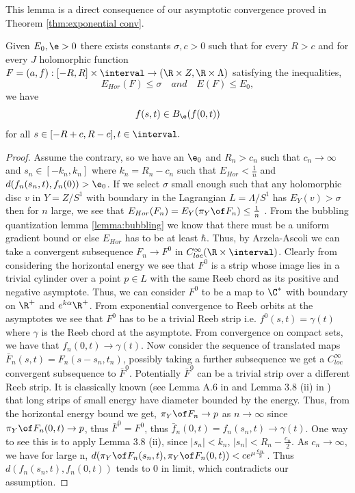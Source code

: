 \noindent This lemma is a direct consequence of our asymptotic convergence proved in Theorem \ref{thm:exponential conv}.

\begin{lemma}\label{lemma:energytodistance}
Given $E_0,\e>0$ there exists constants $\sigma,c>0$ such that for every $R>c$ and for every $J$ holomorphic function $F=(a,f) : [-R,R] \times \interval \to (\R \times Z, \R \times \Lambda)$ satisfying the inequalities, 
$$E_{Hor} (F) \leq \sigma \quad and \quad E(F)\leq E_0,$$ 
we have 
$$f(s,t) \in B_\e(f(0,t))$$ for all $s\in [-R+c,R-c] , t\in \interval.$

\end{lemma}

\begin{proof}
Assume the contrary, so we have an $\e_0$ and $R_n>c_n$ such that $c_n \to \infty$ and $s_n \in [-k_n,k_n]$ where $k_n=R_n - c_n$ such that $E_{Hor} < \frac{1}{n}$ and $d(f_n(s_n,t),f_n(0)) > \e_0$. If we select $\sigma$ small enough such that any holomorphic disc $v$ in $Y = Z/S^1 $ with boundary in the Lagrangian $L = \Lambda/S^1$  has $E_{Y}(v) > \sigma$ then  for $n$ large, we see that $ E_{Hor} (F_n) = E_{Y} (\pi_{Y} \of F_n) \leq  \frac{1}{n}$ .  From  the bubbling quantization lemma \ref{lemma:bubbling} we know that there must be a uniform gradient bound or else $E_{Hor}$ has to be at least $\hbar$. Thus, by Arzela-Ascoli we can take a convergent subsequence $F_n \to F^0$ in $C^\infty_{loc} (\R\times \interval)$. Clearly from considering the horizontal energy we see that $F^0$ is a strip whose image lies in a trivial cylinder over a point $p \in L$ with the same Reeb chord as its positive and negative asymptote. Thus, we can consider $F^0$ to be a map to $\C^*$ with boundary on $\R^+$ and $e^{k\alpha}\R^+$. From exponential convergence to Reeb orbits at the asymptotes we see that $F^0$ has to be a trivial Reeb strip i.e. $f^0(s,t) = \gamma (t)$ where $\gamma$ is the Reeb chord at the asymptote. From convergence on compact sets, we have that $f_n(0,t) \to \gamma(t)$. Now consider the sequence of translated maps $\bar{F}_n(s,t) = F_n(s-s_n,t_n)$, possibly taking a further subsequence we get a $C^\infty_{loc}$ convergent subsequence to $\bar{F}^0$. Potentially $\bar{F}^0$ can be a trivial strip over a different Reeb strip. It is classically known (see Lemma A.6 in \cite{FraunThes} and Lemma 3.8 (ii) in \cite{schm}) that long strips of small energy have diameter bounded by the energy. Thus, from the horizontal energy bound  we get,    $\pi_{Y} \of F_n \to p$ as $n \to \infty$ since $\pi_{Y} \of F_n(0,t) \to p$, thus $\bar{F}^0 = F^0$, thus $\bar{f}_n(0,t)=f_n(s_n,t) \to \gamma (t)$. One way to see this is to apply Lemma 3.8 (ii), since $|s_n| < k_n$, $|s_n| <  R_n - \frac{c_n}{2}$. As $c_n \to \infty$, we have for large n, $d(\pi_{Y} \of F_n(s_n,t), \pi_{Y} \of F_n(0,t)) < ce^{\mu \frac{c_n}{2}}$.   Thus $d(f_n(s_n,t),f_n(0,t))$ tends  to $ 0 $ in  limit, which contradicts our assumption. 

\end{proof}


